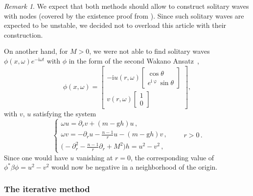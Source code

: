 \documentclass[12pt]{extarticle}
\newcommand{\coupling}{\mathrm{g}}
\newcommand{\jj}{\mathrm{i}}
\newcommand{\p}{\partial}
\theoremstyle{plain}
\theoremstyle{remark}
\newtheorem{remark}[lemma]{Remark}
\begin{document}
\begin{remark}\label{remark-wakano-2}
We expect that both methods should allow to construct
solitary waves with nodes
(covered by the existence proof from \cite{esteban1996stationary}).
Since such solitary waves
are expected to be unstable,
we decided not to overload this
article with their construction.

On another hand,
for $M>0$,
we were not able to find
solitary waves
$\phi(x,\omega)e^{-\jj\omega t}$
with $\phi$
in the form of the second Wakano Ansatz~\cite{wakano-1966},
\begin{equation}\label{sw-2}
    \phi(x,\omega)
    =
    \begin{bmatrix}
        -\jj u(r,\omega)
        \begin{bmatrix}\cos\theta\\e^{\jj\upvarphi}\sin\theta\end{bmatrix}
        \\
        v(r,\omega)\begin{bmatrix}1\\0\end{bmatrix}
    \end{bmatrix},
\end{equation}
with $v,\,u$ satisfying the system
\begin{equation}\label{dkg-stationary-2}
    \begin{cases}
        \omega u=\p_r v+(m-\coupling h)u\,,
        \\
        \omega v=-\p_r u-\frac{n-1}{r}u
        -(m-\coupling h)v\,,
        \\
        \bigl(-\p_r^2-\frac{n-1}{r}\p_r+M^2\bigr)h
        =u^2-v^2\,,
    \end{cases}
    \qquad r>0\,.
\end{equation}
Since one would have $u$ vanishing at $r=0$,
the corresponding value of
$\phi^*\beta\phi=u^2-v^2$
would now be negative in a neighborhood of the origin.
\end{remark}

\subsubsection*{The iterative method}
\end{document}

